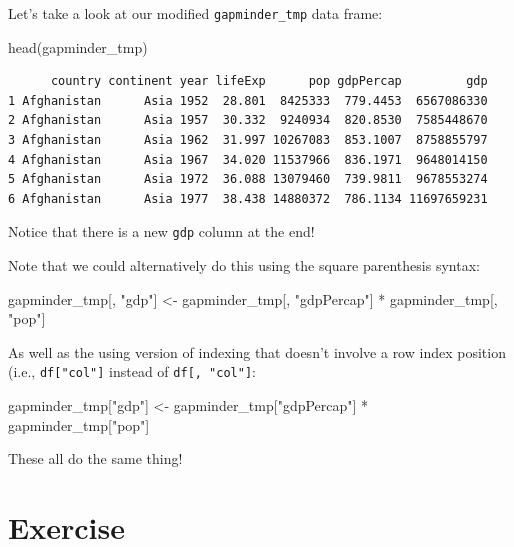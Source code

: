 \documentclass[
  letterpaper,
  DIV=11,
  numbers=noendperiod]{scrreprt}
\newenvironment{Shaded}{\begin{snugshade}}{\end{snugshade}}
\newcommand{\FunctionTok}[1]{\textcolor[rgb]{0.28,0.35,0.67}{#1}}
\newcommand{\NormalTok}[1]{\textcolor[rgb]{0.00,0.23,0.31}{#1}}
\newcommand{\OtherTok}[1]{\textcolor[rgb]{0.00,0.23,0.31}{#1}}
\newcommand{\SpecialCharTok}[1]{\textcolor[rgb]{0.37,0.37,0.37}{#1}}
\newcommand{\StringTok}[1]{\textcolor[rgb]{0.13,0.47,0.30}{#1}}
\begin{document}
Let's take a look at our modified \texttt{gapminder\_tmp} data frame:

\begin{Shaded}
\begin{Highlighting}[]
\FunctionTok{head}\NormalTok{(gapminder\_tmp)}
\end{Highlighting}
\end{Shaded}

\begin{verbatim}
      country continent year lifeExp      pop gdpPercap         gdp
1 Afghanistan      Asia 1952  28.801  8425333  779.4453  6567086330
2 Afghanistan      Asia 1957  30.332  9240934  820.8530  7585448670
3 Afghanistan      Asia 1962  31.997 10267083  853.1007  8758855797
4 Afghanistan      Asia 1967  34.020 11537966  836.1971  9648014150
5 Afghanistan      Asia 1972  36.088 13079460  739.9811  9678553274
6 Afghanistan      Asia 1977  38.438 14880372  786.1134 11697659231
\end{verbatim}

Notice that there is a new \texttt{gdp} column at the end!

Note that we could alternatively do this using the square parenthesis
syntax:

\begin{Shaded}
\begin{Highlighting}[]
\NormalTok{gapminder\_tmp[, }\StringTok{"gdp"}\NormalTok{] }\OtherTok{\textless{}{-}}\NormalTok{ gapminder\_tmp[, }\StringTok{"gdpPercap"}\NormalTok{] }\SpecialCharTok{*}\NormalTok{ gapminder\_tmp[, }\StringTok{"pop"}\NormalTok{]}
\end{Highlighting}
\end{Shaded}

As well as the using version of indexing that doesn't involve a row
index position (i.e., \texttt{df{[}"col"{]}} instead of
\texttt{df{[},\ "col"{]}}:

\begin{Shaded}
\begin{Highlighting}[]
\NormalTok{gapminder\_tmp[}\StringTok{"gdp"}\NormalTok{] }\OtherTok{\textless{}{-}}\NormalTok{ gapminder\_tmp[}\StringTok{"gdpPercap"}\NormalTok{] }\SpecialCharTok{*}\NormalTok{ gapminder\_tmp[}\StringTok{"pop"}\NormalTok{]}
\end{Highlighting}
\end{Shaded}

These all do the same thing!

\section{Exercise}
\end{document}
